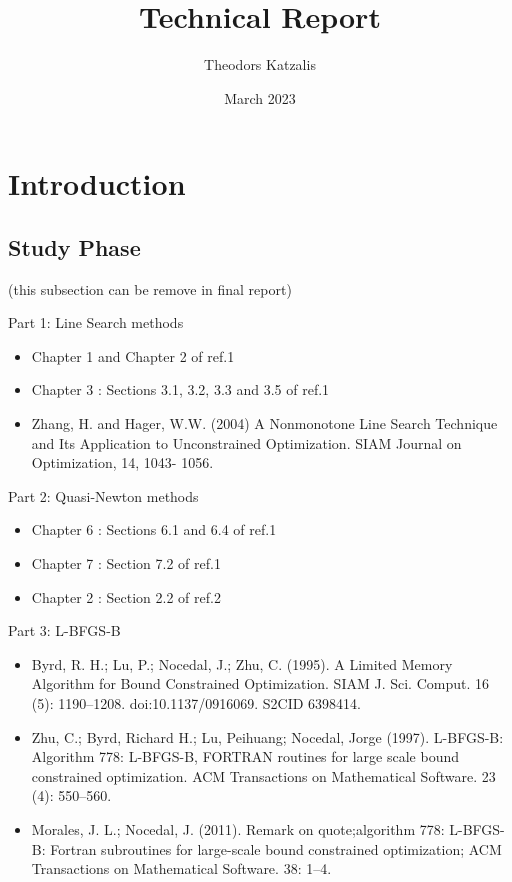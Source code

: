 \documentclass[a4paper,11pt]{article}
\title{Technical Report}
\author{Theodors Katzalis}
\date{March 2023}
\numberwithin{equation}{section} %
\begin{document}
\maketitle

\tableofcontents
\newpage

\section{Introduction}
\label{intro}

\subsection{Study Phase} (this subsection can be remove in final report)

Part 1: Line Search methods

\begin{itemize}
\item Chapter 1 and Chapter 2 of ref.1
\item Chapter 3 : Sections 3.1, 3.2, 3.3 and 3.5 of ref.1
\item Zhang, H. and Hager, W.W. (2004) A Nonmonotone Line Search Technique and Its Application to Unconstrained Optimization. SIAM Journal on Optimization, 14, 1043-
1056.
\end{itemize}

Part 2: Quasi-Newton methods
\begin{itemize}
\item Chapter 6 : Sections 6.1 and 6.4 of ref.1
\item Chapter 7 : Section 7.2 of ref.1
\item Chapter 2 : Section 2.2 of ref.2
\end{itemize}

Part 3: L-BFGS-B
\begin{itemize}

\item Byrd, R. H.; Lu, P.; Nocedal, J.; Zhu, C. (1995). A Limited Memory Algorithm for
Bound Constrained Optimization. SIAM J. Sci. Comput. 16 (5): 1190–1208.
doi:10.1137/0916069. S2CID 6398414.

\item Zhu, C.; Byrd, Richard H.; Lu, Peihuang; Nocedal, Jorge (1997). L-BFGS-B: Algorithm 778: L-BFGS-B, FORTRAN routines for large scale bound constrained optimization. ACM Transactions on Mathematical Software. 23 (4): 550–560.

\item Morales, J. L.; Nocedal, J. (2011). Remark on quote;algorithm 778: L-BFGS-B:
Fortran subroutines for large-scale bound constrained optimization; ACM Transactions on Mathematical Software. 38: 1–4.

\end{itemize}
\end{document}
